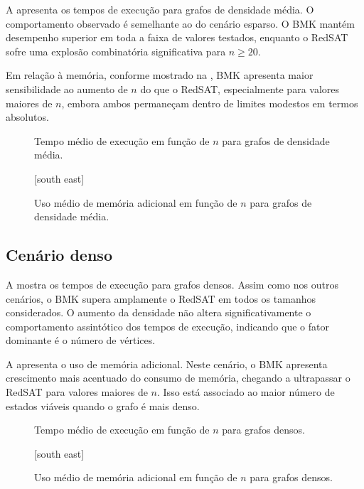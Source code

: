 A  apresenta os tempos de execução para grafos de densidade média. O comportamento observado é semelhante ao do cenário esparso. O BMK mantém desempenho superior em toda a faixa de valores testados, enquanto o RedSAT sofre uma explosão combinatória significativa para $n \geq 20$.

Em relação à memória, conforme mostrado na , BMK apresenta maior sensibilidade ao aumento de $n$ do que o RedSAT, especialmente para valores maiores de $n$, embora ambos permaneçam dentro de limites modestos em termos absolutos.

\begin{figure}[H]
    \centering
    \caption{Tempo médio de execução em função de $n$ para grafos de densidade média.}
    \label{fig:medio-tempo}
\end{figure}

\begin{figure}[H]
    \centering
    [south east]
    \caption{Uso médio de memória adicional em função de $n$ para grafos de densidade média.}
    \label{fig:medio-memoria}
\end{figure}

\subsection{Cenário denso}

A  mostra os tempos de execução para grafos densos. Assim como nos outros cenários, o BMK supera amplamente o RedSAT em todos os tamanhos considerados. O aumento da densidade não altera significativamente o comportamento assintótico dos tempos de execução, indicando que o fator dominante é o número de vértices.

A  apresenta o uso de memória adicional. Neste cenário, o BMK apresenta crescimento mais acentuado do consumo de memória, chegando a ultrapassar o RedSAT para valores maiores de $n$. Isso está associado ao maior número de estados viáveis quando o grafo é mais denso.

\begin{figure}[H]
    \centering
    \caption{Tempo médio de execução em função de $n$ para grafos densos.}
    \label{fig:denso-tempo}
\end{figure}

\begin{figure}[H]
    \centering
    [south east]
    \caption{Uso médio de memória adicional em função de $n$ para grafos densos.}
    \label{fig:denso-memoria}
\end{figure}

